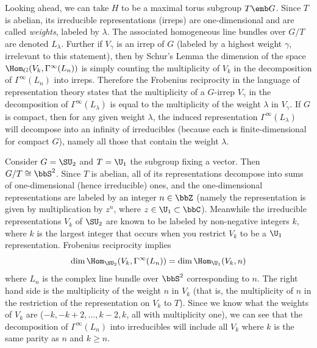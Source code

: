 \begin{example}
    Looking ahead, we can take $H$ to be a maximal torus subgroup $T\emb G$. Since $T$ is abelian, its irreducible representations (irreps) are one-dimensional and are called \emph{weights}, labeled by $\lambda$. The associated homogeneous line bundles over $G\slash T$ are denoted $L_\lambda$. Further if $V_\gamma$ is an irrep of $G$ (labeled by a highest weight $\gamma$, irrelevant to this statement), then by Schur's Lemma the dimension of the space $\Hom_G(V_k,\Gamma^\infty(L_n))$ is simply counting the multiplicity of $V_k$ in the decomposition of $\Gamma^\infty(L_n)$ into irreps. Therefore the Frobenius reciprocity in the language of representation theory states that the multiplicity of a $G$-irrep $V_\gamma$ in the decomposition of $\Gamma^\infty(L_\lambda)$ is equal to the multiplicity of the weight $\lambda$ in $V_\gamma$. If $G$ is compact, then for any given weight $\lambda$, the induced representation $\Gamma^\infty(L_\lambda)$ will decompose into an infinity of irreducibles (because each is finite-dimensional for compact $G$), namely all those that contain the weight $\lambda$.

    Consider $G=\SU_2$ and $T=\U_1$ the subgroup fixing a vector. Then $G\slash T\cong \bbS^2$. Since $T$ is abelian, all of its representations decompose into sums of one-dimensional (hence irreducible) ones, and the one-dimensional representations are labeled by an integer $n\in\bbZ$ (namely the representation is given by multiplication by $z^n$, where $z\in\U_1\subset \bbC$). Meanwhile the irreducible representations $V_k$ of $\SU_2$ are known to be labeled by non-negative integers $k$, where $k$ is the largest integer that occurs when you restrict $V_k$ to be a $\U_1$ representation. Frobenius reciprocity implies
    \[\dim\Hom_{\SU_2}(V_k,\Gamma^\infty(L_n))=\dim \Hom_{\U_1}(V_k,n)\]
    where $L_n$ is the complex line bundle over $\bbS^2$ corresponding to $n$. The right hand side is the multiplicity of the weight $n$ in $V_k$ (that is, the multiplicity of $n$ in the restriction of the representation on $V_k$ to $T$). Since we know what the weights of $V_k$ are ($-k,-k+2,\ldots,k-2,k$, all with multiplicity one), we can see that the decomposition of $\Gamma^\infty(L_n)$ into irreducibles will include all $V_k$ where $k$ is the same parity as $n$ and $k\geq n$.


\end{example}
